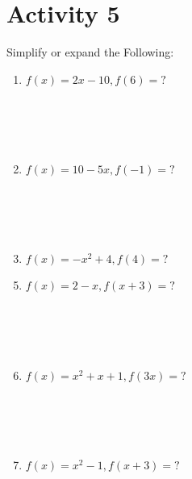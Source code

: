 \documentclass{article}
\begin{document}
\section*{Activity 5}
Simplify or expand the Following:\\
\begin{minipage}[t]{0.45\textwidth}
    \begin{enumerate}
        \item $f(x) = 2x - 10, f(6)=?$
        \\\\\\\\\\
        \item $f(x) = 10 - 5x, f(-1)=?$
        \\\\\\\\\\
        \item $f(x) = -x^2 + 4, f(4)=?$
    \end{enumerate}
\end{minipage}%
\hfill
\begin{minipage}[t]{0.45\textwidth}
    \begin{enumerate}
        \setcounter{enumi}{4} %
        \item $f(x) = 2 - x, f(x+3)=?$
        \\\\\\\\\\
        \item $f(x) = x^2 + x + 1, f(3x)=?$
        \\\\\\\\\\
        \item $f(x)= x^2 - 1, f(x+3)=?$

    \end{enumerate}
\end{minipage}
\vspace{4cm}
\end{document}
